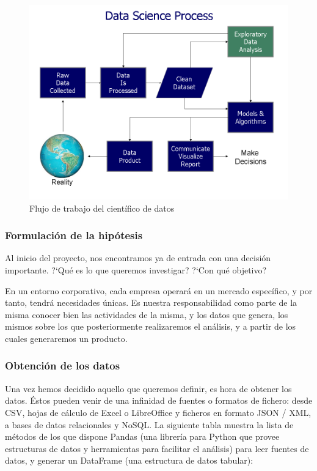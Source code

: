\begin{figure}[ht!]
  \centering
  \includegraphics[scale = 0.65]{img/data_science_process.png}
  \caption{\label{fig:dataScienceWorkflow} Flujo de trabajo del científico de datos}
\end{figure}


\subsubsection{Formulación de la hipótesis}
\label{subsec:state_dataScience_workflow_1}

Al inicio del proyecto, nos encontramos ya de entrada con una decisión
importante. ?`Qué es lo que queremos investigar? ?`Con qué objetivo?

En un entorno corporativo, cada empresa operará en un mercado específico, y por
tanto, tendrá necesidades únicas. Es nuestra responsabilidad como parte de la
misma conocer bien las actividades de la misma, y los datos que genera, los
mismos sobre los que posteriormente realizaremos el análisis, y a partir de los
cuales generaremos un producto.

\subsubsection{Obtención de los datos}
\label{subsec:state_dataScience_workflow_1}

Una vez hemos decidido aquello que queremos definir, es hora de obtener los
datos. Éstos pueden venir de una infinidad de fuentes o formatos de fichero:
desde CSV, hojas de cálculo de Excel o LibreOffice y ficheros en formato JSON /
XML, a bases de datos relacionales y NoSQL. La siguiente tabla muestra la lista
de métodos de los que dispone Pandas (una librería para Python que provee
estructuras de datos y herramientas para facilitar el análisis) para leer
fuentes de datos, y generar un DataFrame (una estructura de datos tabular):


